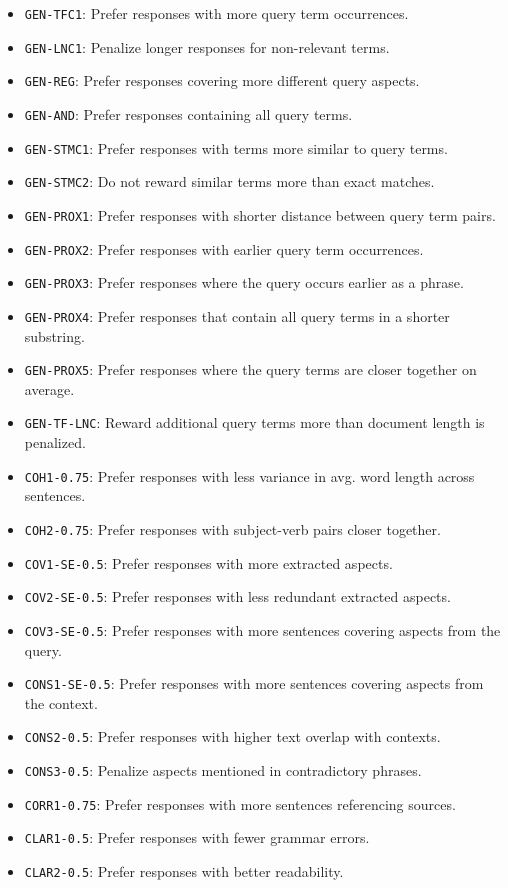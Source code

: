 \documentclass[]{ceurart}
\begin{document}
\begin{itemize}
\item
\texttt{GEN-TFC1}: Prefer responses with more query term occurrences.
\item
\texttt{GEN-LNC1}: Penalize longer responses for non-relevant terms.
\item
\texttt{GEN-REG}: Prefer responses covering more different query aspects.
\item
\texttt{GEN-AND}: Prefer responses containing all query terms.
\item
\texttt{GEN-STMC1}: Prefer responses with terms more similar to query terms.
\item
\texttt{GEN-STMC2}: Do not reward similar terms more than exact matches.
\item
\texttt{GEN-PROX1}: Prefer responses with shorter distance between query term pairs.
\item
\texttt{GEN-PROX2}: Prefer responses with earlier query term occurrences.
\item
\texttt{GEN-PROX3}: Prefer responses where the query occurs earlier as a phrase.
\item
\texttt{GEN-PROX4}: Prefer responses that contain all query terms in a shorter substring.
\item
\texttt{GEN-PROX5}: Prefer responses where the query terms are closer together on average.
\item
\texttt{GEN-TF-LNC}: Reward additional query terms more than document length is penalized.
\item
\texttt{COH1-0.75}: Prefer responses with less variance in avg. word length across sentences.
\item
\texttt{COH2-0.75}: Prefer responses with subject-verb pairs closer together.
\item
\texttt{COV1-SE-0.5}: Prefer responses with more extracted aspects.
\item
\texttt{COV2-SE-0.5}: Prefer responses with less redundant extracted aspects.
\item
\texttt{COV3-SE-0.5}: Prefer responses with more sentences covering aspects from the query.
\item
\texttt{CONS1-SE-0.5}: Prefer responses with  more sentences covering aspects from the context.
\item
\texttt{CONS2-0.5}: Prefer responses with higher text overlap with contexts.
\item
\texttt{CONS3-0.5}: Penalize aspects mentioned in contradictory phrases.
\item
\texttt{CORR1-0.75}: Prefer responses with more sentences referencing sources.
\item
\texttt{CLAR1-0.5}: Prefer responses with fewer grammar errors.
\item
\texttt{CLAR2-0.5}: Prefer responses with better readability.
\end{itemize}
\end{document}
